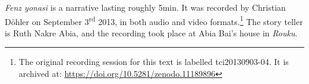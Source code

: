 \textit{Fenz yonasi} is a narrative lasting roughly 5min. It was recorded by Christian Döhler on September 3\textsuperscript{rd} 2013, in both audio and video formats.\footnote{The original recording session for this text is labelled tci20130903-04. It is archived at: \href{https://doi.org/10.5281/zenodo.11189896}{https://doi.org/10.5281/zenodo.11189896}} The story teller is Ruth Nakre Abia, and the recording took place at Abia Bai's house in \textit{Rouku}.
